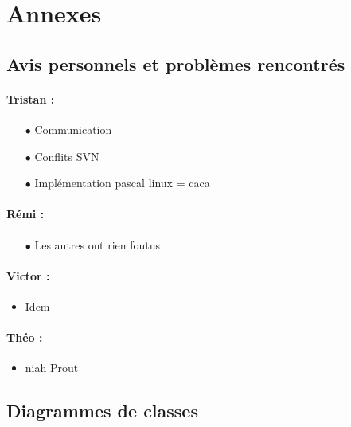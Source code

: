 \section{Annexes}
\subsection{Avis personnels et problèmes rencontrés}
\paragraph{Tristan :}
\begin{itemize}
\item[$\bullet$]Communication
\item[$\bullet$]Conflits SVN
\item[$\bullet$]Implémentation pascal linux = caca
\end{itemize}
\paragraph{Rémi :}
\begin{itemize}
\item[$\bullet$] Les autres ont rien foutus
\end{itemize}
\paragraph{Victor :}
\begin{itemize}
\item Idem
\end{itemize}

\paragraph{Théo :}
\begin{itemize}
\item niah
\itemindent Prout
\end{itemize}

\newpage
\subsection{Diagrammes de classes}

